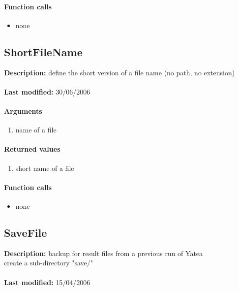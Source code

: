 \paragraph{Function calls}
\begin{itemize}
\item none
\end{itemize}

\subsection{ShortFileName}
\textbf{Description:} define the short version of a file name (no path, no extension)\\
\\\textbf{Last modified:} 30/06/2006

\paragraph{Arguments}
\begin{enumerate}
\item name of a file
\end{enumerate}

\paragraph{Returned values}
\begin{enumerate}
\item short name of a file
\end{enumerate}

\paragraph{Function calls}
\begin{itemize}
\item none
\end{itemize}

\subsection{SaveFile}
\textbf{Description:} backup for result files from a previous run of Yatea\\
create a sub-directory "save/"\\
\\\textbf{Last modified:} 15/04/2006

